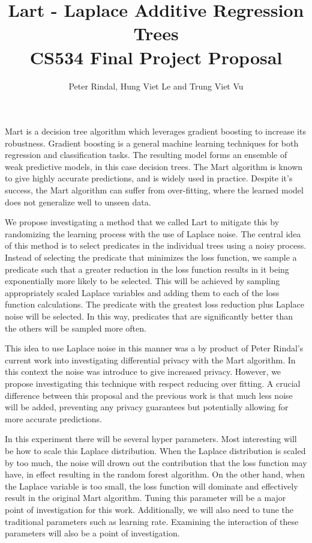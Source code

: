 \documentclass[]{scrartcl}
\title{Lart - Laplace Additive Regression Trees\\ \vspace{0.4cm}
	\large CS534 Final Project Proposal}
\author{Peter Rindal, Hung Viet Le and Trung Viet Vu}
\begin{document}
\maketitle

Mart \cite{friedman2003multiple} is a decision tree algorithm which leverages gradient boosting to increase its robustness. Gradient boosting is a general machine learning techniques for both regression and classification tasks. The resulting model forms an ensemble of weak predictive models, in this case decision trees.   The Mart algorithm is known to give highly accurate predictions\cite{rashmi2015dart}, and is widely used in practice. Despite it's success, the Mart algorithm can suffer from over-fitting, where the learned model does not generalize well to unseen data.

We propose investigating a method that we called Lart to mitigate this by randomizing the learning process with the use of Laplace noise. The central idea of this method is to select predicates in the individual trees using a noisy process. Instead of selecting the predicate that minimizes the loss function, we sample a predicate such that a greater reduction in the loss function results in it being exponentially more likely to be selected. This will be achieved by sampling appropriately scaled Laplace variables and adding them to each of the loss function calculations. The predicate with the greatest loss reduction plus Laplace noise will be selected. In this way, predicates that are significantly better than the others will be sampled more often.

This idea to use Laplace noise in this manner was a by product of Peter Rindal's current work into investigating differential privacy with the Mart algorithm. In this context the noise was introduce to give increased privacy. However, we propose investigating this technique with respect reducing over fitting. A crucial difference between this proposal and the previous work is that much less noise will be added, preventing any privacy guarantees but potentially allowing for more accurate predictions.

In this experiment there will be several hyper parameters. Most interesting will be how to scale this Laplace distribution. When the Laplace distribution is scaled by too much, the noise will drown out the contribution that the loss function may have, in effect resulting in the random forest algorithm. On the other hand, when the Laplace variable is too small, the loss function will dominate and effectively result in the original Mart algorithm. Tuning this parameter will be a major point of investigation for this work. Additionally, we will also need to tune the traditional parameters such as learning rate. Examining the interaction of these parameters will also be a point of investigation.
\end{document}
